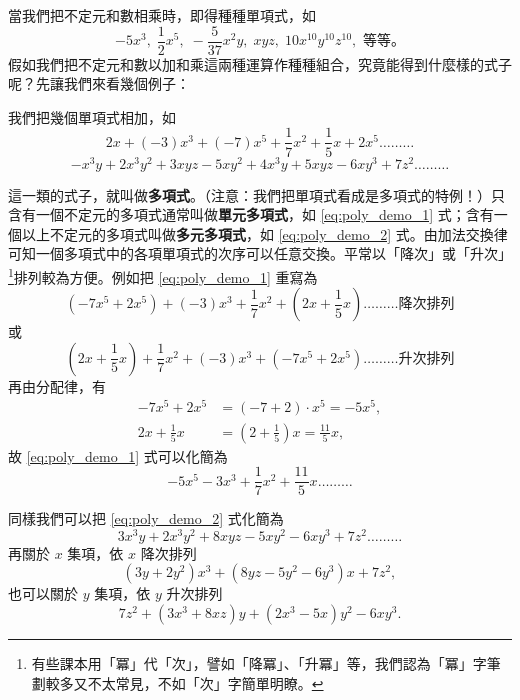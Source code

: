 當我們把不定元和數相乘時，即得種種單項式，如
\begin{equation*}
  -5x^3, \; \frac{1}{2}x^5, \; -\frac{5}{37}x^2 y, \; xyz, \; 10x^{10} y^{10} z^{10}, \text{ 等等。}
\end{equation*}
假如我們把不定元和數以加和乘這兩種運算作種種組合，究竟能得到什麼樣的式子呢？先讓我們來看幾個例子：

\begin{example}\label{ex:5-1-2}
我們把幾個單項式相加，如
\begin{equation}\label{eq:poly_demo_1}
  2x + (-3)x^3 + (-7)x^5 + \frac{1}{7}x^2 + \frac{1}{5}x + 2x^5 \dots\dots\dots
\end{equation}
\begin{equation}\label{eq:poly_demo_2}
  -x^3 y + 2x^3 y^2 + 3xyz - 5xy^2 + 4x^3 y + 5xyz - 6xy^3 + 7z^2 \dots\dots\dots
\end{equation}
\end{example}

這一類的式子，就叫做\textbf{多項式}。（注意：我們把單項式看成是多項式的特例！）只含有一個不定元的多項式通常叫做\textbf{單元多項式}，如 \eqref{eq:poly_demo_1} 式；含有一個以上不定元的多項式叫做\textbf{多元多項式}，如 \eqref{eq:poly_demo_2} 式。由加法交換律可知一個多項式中的各項單項式的次序可以任意交換。平常以「降次」或「升次」\footnote{有些課本用「冪」代「次」，譬如「降冪」、「升冪」等，我們認為「冪」字筆劃較多又不太常見，不如「次」字簡單明瞭。}排列較為方便。例如把 \eqref{eq:poly_demo_1} 重寫為
\begin{equation*}
  (-7x^5 + 2x^5) + (-3)x^3 + \frac{1}{7}x^2 + \left(2x + \frac{1}{5}x\right) \dots\dots\dots \text{降次排列}
\end{equation*}
或
\begin{equation*}
  \left(2x + \frac{1}{5}x\right) + \frac{1}{7}x^2 + (-3)x^3 + (-7x^5 + 2x^5) \dots\dots\dots \text{升次排列}
\end{equation*}
再由分配律，有
\begin{align*}
  -7x^5 + 2x^5 &= (-7+2) \cdot x^5 = -5x^5, \\
  2x + \frac{1}{5}x &= \left(2 + \frac{1}{5}\right)x = \frac{11}{5}x,
\end{align*}
故 \eqref{eq:poly_demo_1} 式可以化簡為
\begin{equation}\label{eq:poly_demo_1_simp}
  -5x^5 - 3x^3 + \frac{1}{7}x^2 + \frac{11}{5}x \dots\dots\dots
\end{equation}

同樣我們可以把 \eqref{eq:poly_demo_2} 式化簡為
\begin{equation}\label{eq:poly_demo_2_simp}
  3x^3 y + 2x^3 y^2 + 8xyz - 5xy^2 - 6xy^3 + 7z^2 \dots\dots\dots
\end{equation}
再關於 $x$ 集項，依 $x$ 降次排列
\begin{equation*}
  (3y + 2y^2)x^3 + (8yz - 5y^2 - 6y^3)x + 7z^2,
\end{equation*}
也可以關於 $y$ 集項，依 $y$ 升次排列
\begin{equation*}
  7z^2 + (3x^3 + 8xz)y + (2x^3 - 5x)y^2 - 6x y^3.
\end{equation*}

